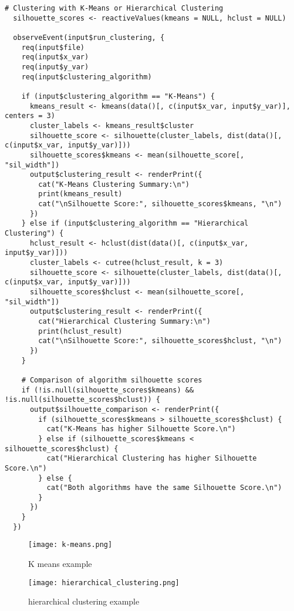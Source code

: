 \documentclass{article}
\begin{document}
\begin{verbatim}
# Clustering with K-Means or Hierarchical Clustering
  silhouette_scores <- reactiveValues(kmeans = NULL, hclust = NULL)
  
  observeEvent(input$run_clustering, {
    req(input$file)
    req(input$x_var)
    req(input$y_var)
    req(input$clustering_algorithm)
    
    if (input$clustering_algorithm == "K-Means") {
      kmeans_result <- kmeans(data()[, c(input$x_var, input$y_var)], centers = 3)
      cluster_labels <- kmeans_result$cluster
      silhouette_score <- silhouette(cluster_labels, dist(data()[, c(input$x_var, input$y_var)]))
      silhouette_scores$kmeans <- mean(silhouette_score[, "sil_width"])
      output$clustering_result <- renderPrint({
        cat("K-Means Clustering Summary:\n")
        print(kmeans_result)
        cat("\nSilhouette Score:", silhouette_scores$kmeans, "\n")
      })
    } else if (input$clustering_algorithm == "Hierarchical Clustering") {
      hclust_result <- hclust(dist(data()[, c(input$x_var, input$y_var)]))
      cluster_labels <- cutree(hclust_result, k = 3)
      silhouette_score <- silhouette(cluster_labels, dist(data()[, c(input$x_var, input$y_var)]))
      silhouette_scores$hclust <- mean(silhouette_score[, "sil_width"])
      output$clustering_result <- renderPrint({
        cat("Hierarchical Clustering Summary:\n")
        print(hclust_result)
        cat("\nSilhouette Score:", silhouette_scores$hclust, "\n")
      })
    }
    
    # Comparison of algorithm silhouette scores
    if (!is.null(silhouette_scores$kmeans) && !is.null(silhouette_scores$hclust)) {
      output$silhouette_comparison <- renderPrint({
        if (silhouette_scores$kmeans > silhouette_scores$hclust) {
          cat("K-Means has higher Silhouette Score.\n")
        } else if (silhouette_scores$kmeans < silhouette_scores$hclust) {
          cat("Hierarchical Clustering has higher Silhouette Score.\n")
        } else {
          cat("Both algorithms have the same Silhouette Score.\n")
        }
      })
    }
  })
\end{verbatim}

\FloatBarrier

\begin{figure}
    \centering
    \texttt{[image: k-means.png]}
    \caption{K means example }
    \label{fig:Clustering}
\end{figure}

\begin{figure}
    \centering
    \texttt{[image: hierarchical\_clustering.png]}
    \caption{hierarchical clustering example }
    \label{fig:Clustering}
\end{figure}
\FloatBarrier
\end{document}
